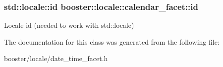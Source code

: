 \subsubsection[{id}]{\setlength{\rightskip}{0pt plus 5cm}std\+::locale\+::id booster\+::locale\+::calendar\+\_\+facet\+::id\hspace{0.3cm}{\ttfamily [static]}}\label{classbooster_1_1locale_1_1calendar__facet_a0879444f636f6520c74e2abb4615f53f}
Locale id (needed to work with std\+::locale) 

The documentation for this class was generated from the following file\+:\begin{DoxyCompactItemize}
\item 
booster/locale/date\+\_\+time\+\_\+facet.\+h\end{DoxyCompactItemize}
